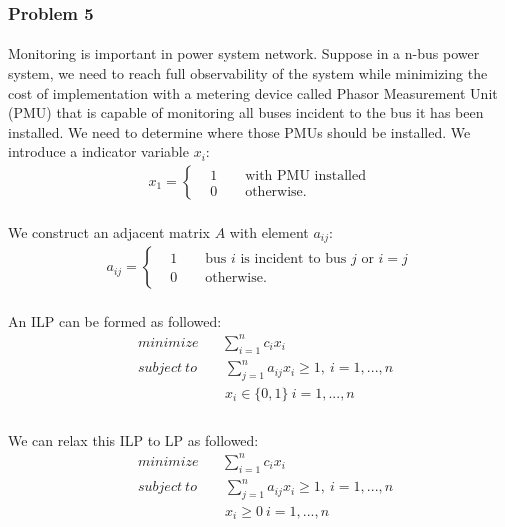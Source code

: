 \subsubsection*{Problem 5}
\paragraph{}
Monitoring is important in power system network. Suppose in a n-bus power system, we need to reach full observability of the system while minimizing the cost of implementation with a metering device called Phasor Measurement Unit (PMU) that is capable of monitoring all buses incident to the bus it has been installed. We need to determine where those PMUs should be installed. We introduce a indicator variable $x_i$:
\begin{align*}
x_1 = \begin{cases}
&1 \qquad \text{with PMU installed}\\
&0 \qquad \text{otherwise}.
\end{cases}
\end{align*}
\paragraph{}
We construct an adjacent matrix $A$ with element $a_{ij}$:
\begin{align*}
a_{ij} = \begin{cases}
&1 \qquad \text{bus $i$ is incident to bus $j$ or }i=j\\
&0 \qquad \text{otherwise}.
\end{cases}
\end{align*}
\paragraph{}
An ILP can be formed as followed:
\begin{align*}
& minimize \quad \ \ \  \sum_{i=1}^{n}c_ix_i\\
& subject \ to \qquad \sum_{j=1}^{n}a_{ij}x_i \geq 1,\  i=1,...,n\\
&\qquad \qquad \quad \quad  \ x_i \in \{0, 1\} \  i=1,...,n \\
\end{align*}
\paragraph{}
We can relax this ILP to LP as followed:
\begin{align*}
& minimize \quad \ \ \  \sum_{i=1}^{n}c_ix_i\\
& subject \ to \qquad \sum_{j=1}^{n}a_{ij}x_i \geq 1,\  i=1,...,n\\
&\qquad \qquad \quad \quad  \ x_i\geq 0 \  i=1,...,n \\
\end{align*}